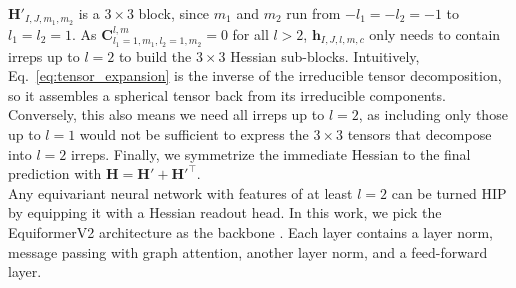 \documentclass[pdflatex,sn-mathphys-num]{sn-jnl}%
\theoremstyle{thmstyleone}%
\theoremstyle{thmstyletwo}%
\theoremstyle{thmstylethree}%
\begin{document}
$\mathbf{H}'_{I,J,m_1,m_2}$ is a $3\times3$ block, since $m_1$ and $m_2$ run from $-l_1=-l_2=-1$ to $l_1=l_2=1$. As $\mathbf{C}^{l,m}_{l_1=1,m_1,l_2=1,m_2} = 0$ for all $l>2$, $\mathbf{h}_{I, J,l,m,c}$ only needs to contain irreps up to $l=2$ to build the $3\times3$ Hessian sub-blocks. Intuitively, Eq.~\eqref{eq:tensor_expansion} is the inverse of the irreducible tensor decomposition, so it assembles a spherical tensor back from its irreducible components. Conversely, this also means we need all irreps up to $l=2$, as including only those up to $l=1$ would not be sufficient to express the $3\times3$ tensors that decompose into $l=2$ irreps.
Finally, we symmetrize the immediate Hessian to the final prediction with $\mathbf{H}=\mathbf{H}' + \mathbf{H}'^\top$.\\
Any equivariant neural network \citep{duvalHitchhikerGuideGeometric2024a} with features of at least $l=2$ can be turned HIP by equipping it with a Hessian readout head. In this work, we pick the EquiformerV2 architecture as the backbone \citep{liao2023equiformerv2}. Each layer contains a layer norm, message passing with graph attention, another layer norm, and a feed-forward layer. 
\end{document}
